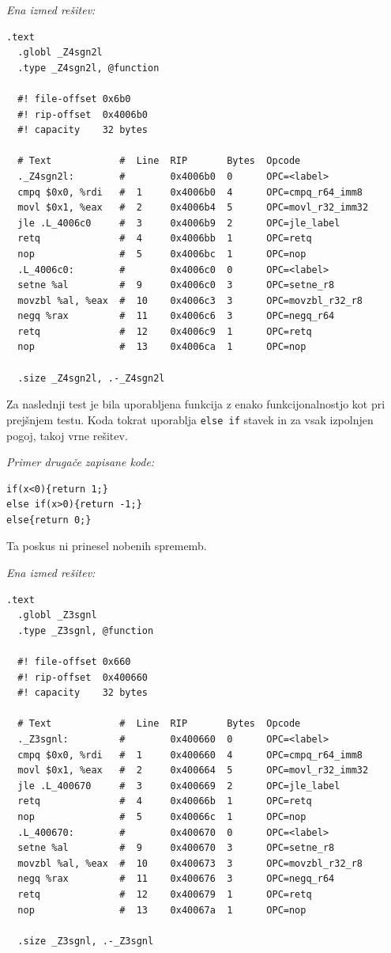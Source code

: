 \documentclass[a4paper, 12pt]{book}
\begin{document}
\noindent
{\it Ena izmed rešitev:}
\begin{Verbatim}[baselinestretch=1]
  .text
  .globl _Z4sgn2l
  .type _Z4sgn2l, @function
  
  #! file-offset 0x6b0
  #! rip-offset  0x4006b0
  #! capacity    32 bytes
  
  # Text            #  Line  RIP       Bytes  Opcode              
  ._Z4sgn2l:        #        0x4006b0  0      OPC=<label>         
  cmpq $0x0, %rdi   #  1     0x4006b0  4      OPC=cmpq_r64_imm8   
  movl $0x1, %eax   #  2     0x4006b4  5      OPC=movl_r32_imm32  
  jle .L_4006c0     #  3     0x4006b9  2      OPC=jle_label       
  retq              #  4     0x4006bb  1      OPC=retq            
  nop               #  5     0x4006bc  1      OPC=nop             
  .L_4006c0:        #        0x4006c0  0      OPC=<label>         
  setne %al         #  9     0x4006c0  3      OPC=setne_r8        
  movzbl %al, %eax  #  10    0x4006c3  3      OPC=movzbl_r32_r8   
  negq %rax         #  11    0x4006c6  3      OPC=negq_r64        
  retq              #  12    0x4006c9  1      OPC=retq            
  nop               #  13    0x4006ca  1      OPC=nop                          
  
  .size _Z4sgn2l, .-_Z4sgn2l
\end{Verbatim}

Za naslednji test je bila uporabljena funkcija z enako funkcijonalnostjo kot pri prejšnjem testu. Koda tokrat uporablja \texttt{else if} stavek in za vsak izpolnjen pogoj, takoj vrne rešitev.
\medskip

\noindent
{\it Primer drugače zapisane kode:}
\begin{Verbatim}[baselinestretch=1]
if(x<0){return 1;}
else if(x>0){return -1;}
else{return 0;}
\end{Verbatim}
Ta poskus ni prinesel nobenih sprememb.
\medskip

\noindent
{\it Ena izmed rešitev:}
\begin{Verbatim}[baselinestretch=1]
  .text
  .globl _Z3sgnl
  .type _Z3sgnl, @function
  
  #! file-offset 0x660
  #! rip-offset  0x400660
  #! capacity    32 bytes
  
  # Text            #  Line  RIP       Bytes  Opcode              
  ._Z3sgnl:         #        0x400660  0      OPC=<label>         
  cmpq $0x0, %rdi   #  1     0x400660  4      OPC=cmpq_r64_imm8   
  movl $0x1, %eax   #  2     0x400664  5      OPC=movl_r32_imm32  
  jle .L_400670     #  3     0x400669  2      OPC=jle_label       
  retq              #  4     0x40066b  1      OPC=retq            
  nop               #  5     0x40066c  1      OPC=nop                     
  .L_400670:        #        0x400670  0      OPC=<label>         
  setne %al         #  9     0x400670  3      OPC=setne_r8        
  movzbl %al, %eax  #  10    0x400673  3      OPC=movzbl_r32_r8   
  negq %rax         #  11    0x400676  3      OPC=negq_r64        
  retq              #  12    0x400679  1      OPC=retq            
  nop               #  13    0x40067a  1      OPC=nop                         
  
  .size _Z3sgnl, .-_Z3sgnl
\end{Verbatim}
\end{document}
